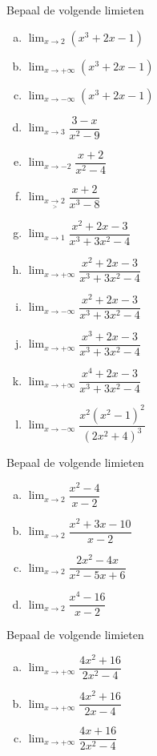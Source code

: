 \documentclass[12pt]{article}
\begin{document}
\begin{oefening}
  Bepaal de volgende limieten
  \begin{multicols}{3}
  \begin{enumerate}[(a)]
  \itemsep1em
  \item $\displaystyle\lim_{x\to 2}\left(x^3+2x-1\right)$
  \item $\displaystyle\lim_{x\to +\infty}\left(x^3+2x-1\right)$
  \item $\displaystyle\lim_{x\to -\infty}\left(x^3+2x-1\right)$
  \item $\displaystyle\lim_{x\to 3}\dfrac{3-x}{x^2-9}$
  \item $\displaystyle\lim_{x\to -2}\dfrac{x+2}{x^2-4}$
  \item $\displaystyle\lim_{x\underset{>}{\to} 2}\dfrac{x+2}{x^3-8}$
  \item $\displaystyle\lim_{x\to 1}\dfrac{x^2+2x-3}{x^3+3x^2-4}$
  \item $\displaystyle\lim_{x\to +\infty}\dfrac{x^2+2x-3}{x^3+3x^2-4}$
  \item $\displaystyle\lim_{x\to -\infty}\dfrac{x^2+2x-3}{x^3+3x^2-4}$
  \item $\displaystyle\lim_{x\to +\infty}\dfrac{x^3+2x-3}{x^3+3x^2-4}$
  \item $\displaystyle\lim_{x\to +\infty}\dfrac{x^4+2x-3}{x^3+3x^2-4}$
  \item $\displaystyle\lim_{x\to -\infty}\dfrac{x^2(x^2-1)^2}{(2x^2+4)^3}$
  \end{enumerate}
  \end{multicols}
\end{oefening}

\begin{oefening}
  Bepaal de volgende limieten
  \begin{multicols}{4}
  \begin{enumerate}[(a)]
  \itemsep1em
  \item $\displaystyle\lim_{x\to 2}\dfrac{x^2-4}{x-2}$
  \item $\displaystyle\lim_{x\to 2}\dfrac{x^2+3x-10}{x-2}$
  \item $\displaystyle\lim_{x\to 2}\dfrac{2x^2-4x}{x^2-5x+6}$
  \item $\displaystyle\lim_{x\to 2}\dfrac{x^4-16}{x-2}$
  \end{enumerate}
  \end{multicols}
\end{oefening}

\begin{oefening}
  Bepaal de volgende limieten
  \begin{multicols}{3}
  \begin{enumerate}[(a)]
  \itemsep1em
  \item $\displaystyle\lim_{x\to +\infty}\dfrac{4x^2+16}{2x^2-4}$
  \item $\displaystyle\lim_{x\to +\infty}\dfrac{4x^2+16}{2x-4}$
  \item $\displaystyle\lim_{x\to +\infty}\dfrac{4x+16}{2x^2-4}$
  \end{enumerate}
  \end{multicols}
\end{oefening}
\end{document}
